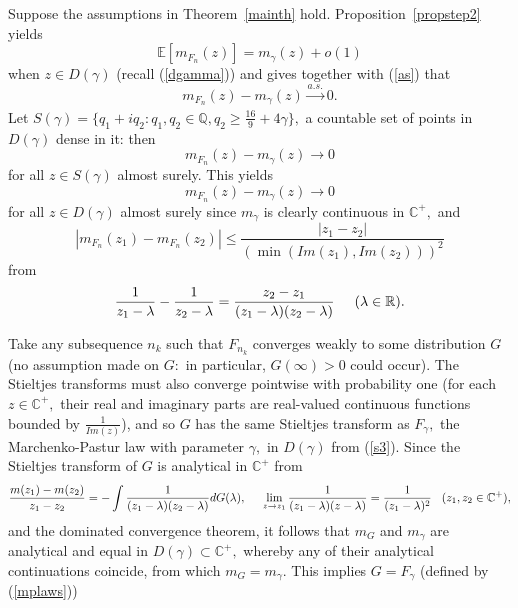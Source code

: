 \documentclass{article}
\numberwithin{equation}{section}
\begin{document}
Suppose the assumptions in Theorem~\ref{mainth} hold. Proposition~\ref{propstep2} yields
\[\mathbb{E}[m_{F_n}(z)]=m_{\gamma}(z)+o(1)\]
when \(z \in D(\gamma)\) (recall (\ref{dgamma})) and gives
together with (\ref{as}) that %
\[m_{F_n}(z)-m_{\gamma}(z) \xrightarrow[]{a.s.} 0.\]
Let \(S(\gamma)=\{q_1+iq_2:q_1,q_2 \in \mathbb{Q}, q_2 \geq \frac{16}{9}+4\gamma\},\) a countable set of points in \(D(\gamma)\) dense in it: then
\[m_{F_n}(z)-m_{\gamma}(z) \to 0\]
for all \(z \in S(\gamma)\) almost surely. This yields
\begin{equation}\tag{\(s3\)}\label{s3}
    m_{F_n}(z)-m_{\gamma}(z) \to 0
\end{equation}
for all \(z \in D(\gamma)\) almost surely since \(m_{\gamma}\) is clearly continuous in \(\mathbb{C}^{+},\) and
\[|m_{F_n}(z_1)-m_{F_n}(z_2)| \leq \frac{|z_1-z_2|}{(\min{(Im(z_1),Im(z_2))})^2}\]
from %
\[\frac{1}{z_1-\lambda}-\frac{1}{z_2-\lambda}=\frac{z_2-z_1}{(z_1-\lambda)(z_2-\lambda)} \hspace{0.5cm} (\lambda \in \mathbb{R}).\]
\par
Take any subsequence \(n_k\) such that \(F_{n_k}\) converges weakly to some distribution \(G\) (no assumption made on \(G:\) in particular, \(G(\infty)>0\) could occur). The Stieltjes transforms must also converge pointwise with probability one (for each \(z \in \mathbb{C}^+,\) their real and imaginary parts are real-valued continuous functions bounded by \(\frac{1}{Im(z)}\)), and so \(G\) has the same Stieltjes transform as \(F_{\gamma},\) the Marchenko-Pastur law with parameter \(\gamma,\) in \(D(\gamma)\) from (\ref{s3}). Since the Stieltjes transform of \(G\) is analytical in \(\mathbb{C}^{+}\) from
\[\frac{m(z_1)-m(z_2)}{z_1-z_2}=-\int{\frac{1}{(z_1-\lambda)(z_2-\lambda)}dG(\lambda)}, \hspace{0.5cm} \lim_{z \to z_1}{\frac{1}{(z_1-\lambda)(z-\lambda)}}= \frac{1}{(z_1-\lambda)^2} \hspace{0.3cm} (z_1,z_2 \in \mathbb{C}^{+}),\]
and %
the dominated convergence theorem, it follows that \(m_G\) and \(m_{\gamma}\) are analytical and equal in \(D(\gamma) \subset \mathbb{C}^{+},\) whereby any of their analytical continuations coincide, from which \(m_G=m_\gamma.\) %
This implies \(G=F_{\gamma}\) (defined by (\ref{mplaws})) %
\end{document}
